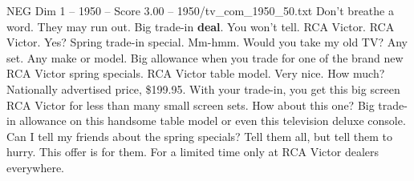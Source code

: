 \begin{textsample}{NEG Dim 1 – 1950 – Score 3.00 – 1950/tv\_com\_1950\_50.txt}  \label{ex:f1_neg_090}
Don't breathe a word.
They may run out.
Big trade-in \textbf{deal}.
You won't tell.
RCA Victor.
RCA Victor.
Yes?
Spring trade-in special.
Mm-hmm.
Would you take my old TV?
Any set.
Any make or model.
Big allowance when you trade for one of the brand new RCA Victor spring specials.
RCA Victor table model.
Very nice.
How much?
Nationally advertised price, \$199.95.
With your trade-in, you get this big screen RCA Victor for less than many small screen sets.
How about this one?
Big trade-in allowance on this handsome table model or even this television deluxe console.
Can I tell my friends about the spring specials?
Tell them all, but tell them to hurry.
This offer is for them.
For a limited time only at RCA Victor dealers everywhere.

\end{textsample}
